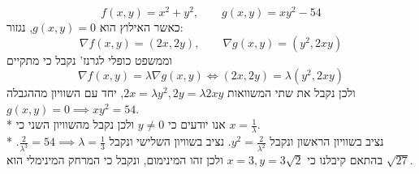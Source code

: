 



\[
	f(x, y) = x^2 + y^2,
	\qquad
	g(x, y) = xy^2 - 54
\]
כאשר האילוץ הוא $g(x, y) = 0$, נגזור:
\[
	\nabla f(x, y) = (2x, 2y),
	\qquad
	\nabla g(x, y) = (y^2, 2xy)
\]
וממשפט כופלי לגרנז' נקבל כי מתקיים
\[
	\nabla f(x, y) = \lambda \nabla g(x, y)
	\iff
	(2x, 2y) = \lambda (y^2, 2xy)
\]
ולכן נקבל את שתי המשוואות $2x = \lambda y^2, 2y = \lambda 2xy$,
יחד עם השוויון מההגבלה $g(x, y) = 0 \implies xy^2 = 54$. \\*
אנו יודעים כי $y \ne 0$ ולכן נקבל מהשוויון השני כי $x = \frac{1}{\lambda}$. \\*
נציב בשוויון הראשון ונקבל $y^2 = \frac{2}{\lambda^2}$.
נציב בשוויון השלישי ונקבל $\frac{2}{\lambda^3} = 54 \implies \lambda = \frac{1}{3}$.
בהתאם קיבלנו כי $x = 3, y = 3 \sqrt{2}$ ולכן זהו המינימום, ונקבל כי המרחק המינימלי הוא $\sqrt{27}$.


